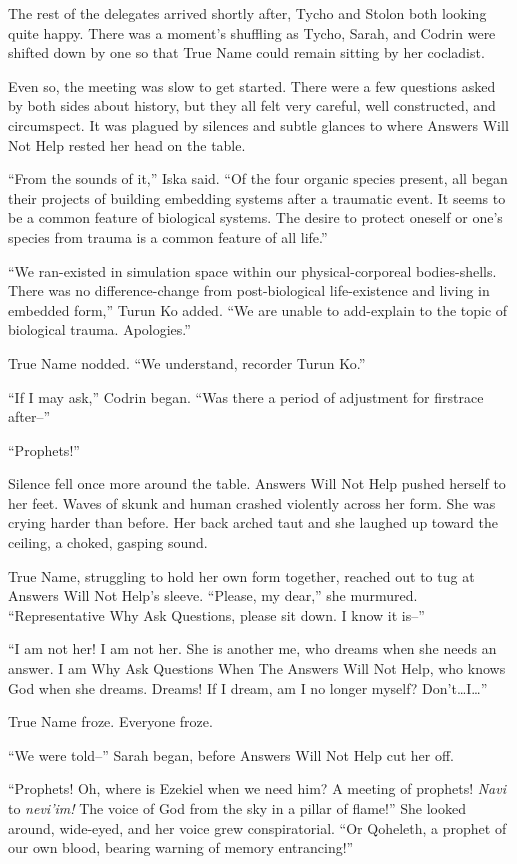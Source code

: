 The rest of the delegates arrived shortly after, Tycho and Stolon both looking quite happy. There was a moment's shuffling as Tycho, Sarah, and Codrin were shifted down by one so that True Name could remain sitting by her cocladist.

Even so, the meeting was slow to get started. There were a few questions asked by both sides about history, but they all felt very careful, well constructed, and circumspect. It was plagued by silences and subtle glances to where Answers Will Not Help rested her head on the table.

``From the sounds of it,'' Iska said. ``Of the four organic species present, all began their projects of building embedding systems after a traumatic event. It seems to be a common feature of biological systems. The desire to protect oneself or one's species from trauma is a common feature of all life.''

``We ran-existed in simulation space within our physical-corporeal bodies-shells. There was no difference-change from post-biological life-existence and living in embedded form,'' Turun Ko added. ``We are unable to add-explain to the topic of biological trauma. Apologies.''

True Name nodded. ``We understand, recorder Turun Ko.''

``If I may ask,'' Codrin began. ``Was there a period of adjustment for firstrace after--''

``Prophets!''

Silence fell once more around the table. Answers Will Not Help pushed herself to her feet. Waves of skunk and human crashed violently across her form. She was crying harder than before. Her back arched taut and she laughed up toward the ceiling, a choked, gasping sound.

True Name, struggling to hold her own form together, reached out to tug at Answers Will Not Help's sleeve. ``Please, my dear,'' she murmured. ``Representative Why Ask Questions, please sit down. I know it is--''

``I am not her! I am not her. She is another me, who dreams when she needs an answer. I am Why Ask Questions When The Answers Will Not Help, who knows God when she dreams. Dreams! If I dream, am I no longer myself? Don't\ldots I\ldots{}''

True Name froze. Everyone froze.

``We were told--'' Sarah began, before Answers Will Not Help cut her off.

``Prophets! Oh, where is Ezekiel when we need him? A meeting of prophets! \emph{Navi} to \emph{nevi'im!} The voice of God from the sky in a pillar of flame!'' She looked around, wide-eyed, and her voice grew conspiratorial. ``Or Qoheleth, a prophet of our own blood, bearing warning of memory entrancing!''

